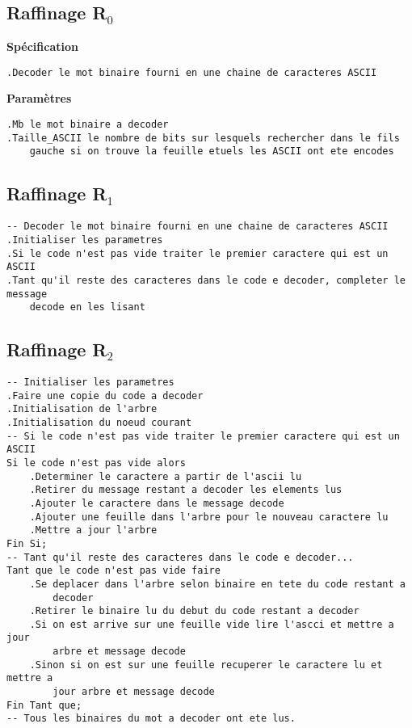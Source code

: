\documentclass{book}
\begin{document}
\subsection{Raffinage R$_{0}$}
\textbf{Spécification}
\begin{lstlisting}[frame=single]
.Decoder le mot binaire fourni en une chaine de caracteres ASCII
\end{lstlisting}
\textbf{Paramètres}
\begin{lstlisting}[frame=single]
.Mb le mot binaire a decoder
.Taille_ASCII le nombre de bits sur lesquels rechercher dans le fils
	gauche si on trouve la feuille etuels les ASCII ont ete encodes
\end{lstlisting}

\subsection{Raffinage R$_{1}$}
\begin{lstlisting}[frame=single]
-- Decoder le mot binaire fourni en une chaine de caracteres ASCII
.Initialiser les parametres
.Si le code n'est pas vide traiter le premier caractere qui est un ASCII
.Tant qu'il reste des caracteres dans le code e decoder, completer le message
	decode en les lisant
\end{lstlisting}

\subsection{Raffinage R$_{2}$}
\begin{lstlisting}[frame=single]
-- Initialiser les parametres
.Faire une copie du code a decoder
.Initialisation de l'arbre
.Initialisation du noeud courant
-- Si le code n'est pas vide traiter le premier caractere qui est un ASCII
Si le code n'est pas vide alors
	.Determiner le caractere a partir de l'ascii lu
	.Retirer du message restant a decoder les elements lus
	.Ajouter le caractere dans le message decode
	.Ajouter une feuille dans l'arbre pour le nouveau caractere lu
	.Mettre a jour l'arbre
Fin Si;
-- Tant qu'il reste des caracteres dans le code e decoder...
Tant que le code n'est pas vide faire
	.Se deplacer dans l'arbre selon binaire en tete du code restant a
		decoder
	.Retirer le binaire lu du debut du code restant a decoder
	.Si on est arrive sur une feuille vide lire l'ascci et mettre a jour
		arbre et message decode
	.Sinon si on est sur une feuille recuperer le caractere lu et mettre a
		jour arbre et message decode
Fin Tant que;
-- Tous les binaires du mot a decoder ont ete lus.
\end{lstlisting}
\end{document}
